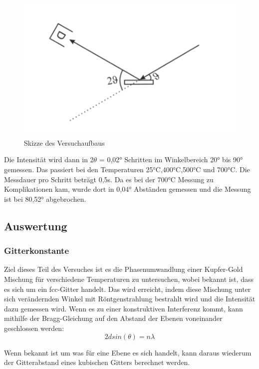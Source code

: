 \documentclass[
	a4paper,
	12pt,
	pagesize,
	ngerman
]{scrartcl}
\begin{document}
\begin{figure}[h]
	\centering
	\includegraphics[scale=0.3]{2theta.PNG}
	\caption{Skizze des Versuchaufbaus}
	\label{theta}
\end{figure}

Die Intensität wird dann in 2$\theta$ = 0,02° Schritten im Winkelbereich 20° bis 90° gemessen. Das passiert bei den Temperaturen 25°C,400°C,500°C und 700°C. Die Messdauer pro Schritt beträgt 0,5s. Da es bei der 700°C Messung zu Komplikationen kam, wurde dort in 0,04° Abständen gemessen und die Messung ist bei 80,52° abgebrochen.

\subsection{Auswertung}
\subsubsection{Gitterkonstante}
Ziel dieses Teil des Versuches ist es die Phasenumwandlung einer Kupfer-Gold Mischung für verschiedene Temperaturen zu untersuchen, wobei bekannt ist, dass es sich um ein fcc-Gitter handelt. Das wird erreicht, indem diese Mischung unter sich verändernden Winkel mit Röntgenstrahlung bestrahlt wird und die Intensität dazu gemessen wird. Wenn es zu einer konstruktiven Interferenz kommt, kann mithilfe der Bragg-Gleichung auf den Abstand der Ebenen voneinander geschlossen werden:
\begin{equation}
2d sin(\theta) = n \lambda
\label{bragg}
\end{equation}

Wenn bekannt ist um was für eine Ebene es sich handelt, kann daraus wiederum der Gitterabstand eines kubischen Gitters berechnet werden.
\end{document}

